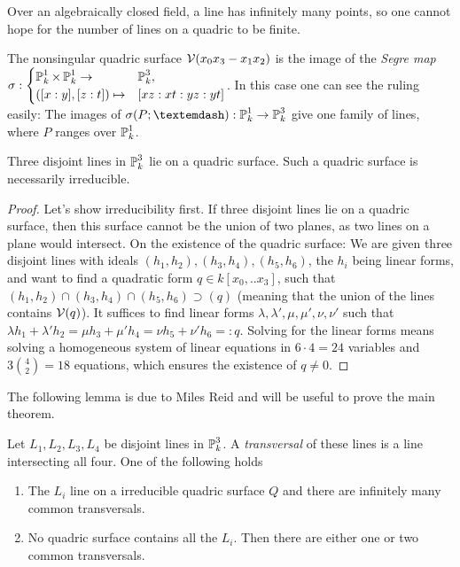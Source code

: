 \begin{remark}
Over an algebraically closed field, a line has infinitely many points, so one cannot hope for the number of lines on a quadric to be finite.
\end{remark}

\begin{remark}
The nonsingular quadric surface $\operatorname{\mathcal V}(x_0x_3 - x_1x_2)$ is the image of the \emph{Segre map} $\sigma : \begin{cases} \operatorname{\mathbb P}^1_k \times \operatorname{\mathbb P}^1_k \to& \operatorname{\mathbb P}^3_k,  \\ ([x:y],[z:t]) \mapsto& [xz:xt:yz:yt] \end{cases}$.
In this case one can see the ruling easily: The images of
$\sigma(P;\textemdash) : \proj^1_k \to \proj^3_k$ give one family of lines, where $P$ ranges over $\operatorname{\mathbb P}^1_k$.
\end{remark}


\begin{lemma} \label{lemmaThreeLines}
Three disjoint lines in $\operatorname{\mathbb P}^3_k$ lie on a quadric surface.
Such a quadric surface is necessarily irreducible.
\end{lemma}
\begin{proof}
Let's show irreducibility first.
If three disjoint lines lie on a quadric surface, then this surface cannot be the union of two planes, as two lines on a plane would intersect.
On the existence of the quadric surface:
We are given three disjoint lines with ideals $(h_1,h_2), (h_3,h_4), (h_5,h_6)$, the $h_i$ being linear forms, and want to find a quadratic form $q \in k[x_0,..x_3]$, such that $(h_1,h_2) \cap (h_3,h_4) \cap (h_5,h_6) \supset (q)$ (meaning that the union of the lines contains $\operatorname{\mathcal V}(q)$).
It suffices to find linear forms $\lambda,\lambda',\mu,\mu',\nu,\nu'$ such that
$\lambda h_1 + \lambda' h_2 = \mu h_3 + \mu' h_4 = \nu h_5 + \nu' h_6 =: q$.
Solving for the linear forms means solving a homogeneous system of linear equations in $6\cdot 4= 24$ variables and $3\binom{4}{2} = 18$ equations, which ensures the existence of $q \neq 0$.
\end{proof}

The following lemma is due to Miles Reid and will be useful to prove the main theorem.
\begin{lemma} \label{lemmaDisjointLines}
Let $L_1,L_2,L_3,L_4$ be disjoint lines in $\operatorname{\mathbb P}^3_k$.
A \emph{transversal} of these lines is a line intersecting all four.
One of the following holds
\begin{enumerate}
\item The $L_i$ line on a irreducible quadric surface $Q$ and there are infinitely many common transversals.
\item No quadric surface contains all the $L_i$. Then there are either one or two common transversals.
\end{enumerate}
\end{lemma}

